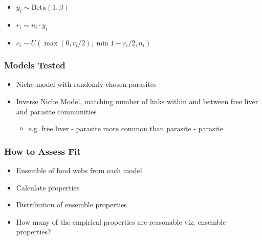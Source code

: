 \documentclass[table]{beamer}
\begin{document}
\begin{frame}
{\begin{itemize}
        \item $y_i \sim \text{Beta}(1,\beta)$
        \item $r_i \sim n_i \cdot y_i$
        \item $c_{i}\sim U(\max{(0,r_i/2)},\min{1-r_i/2,n_i})$
    \end{itemize}
}
\end{frame}

\begin{frame}
    \frametitle{Models Tested}
    \begin{itemize}[<+->]
        \item Niche model with randomly chosen parasites
        \item Inverse Niche Model, matching number of links within and between
            free liver and parasite communities
            \begin{itemize}
                \item e.g. free liver - parasite more common than parasite -
                    parasite
            \end{itemize}
    \end{itemize}
\end{frame}

\begin{frame}
    \frametitle{How to Assess Fit}
    \begin{itemize}[<+->]
        \item Ensemble of food webs from each model
        \item Calculate properties
        \item Distribution of ensemble properties
        \item How many of the empirical properties are reasonable viz. ensemble
            properties?
    \end{itemize}
\end{frame}
\end{document}
